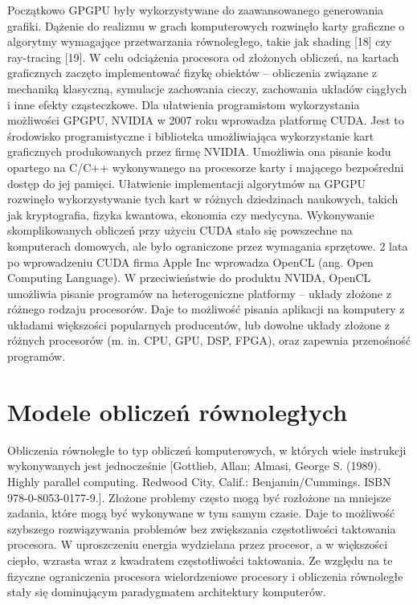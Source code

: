 Początkowo GPGPU były wykorzystywane do zaawansowanego generowania grafiki. Dążenie do realizmu w grach komputerowych rozwinęło karty graficzne o algorytmy wymagające przetwarzania równoległego, takie jak shading [18] czy ray-tracing [19]. W celu odciążenia procesora od złożonych obliczeń, na kartach graficznych zaczęto implementować fizykę obiektów – obliczenia związane z mechaniką klasyczną, symulacje zachowania cieczy, zachowania układów ciągłych i inne efekty cząsteczkowe. Dla ułatwienia programistom wykorzystania możliwości GPGPU, NVIDIA w 2007 roku wprowadza platformę CUDA. Jest to środowisko programistyczne i biblioteka umożliwiająca wykorzystanie kart graficznych produkowanych przez firmę NVIDIA. Umożliwia ona pisanie kodu opartego na C/C++ wykonywanego na procesorze karty i mającego bezpośredni dostęp do jej pamięci. Ułatwienie implementacji algorytmów na GPGPU rozwinęło wykorzystywanie tych kart w różnych dziedzinach naukowych, takich jak kryptografia, fizyka kwantowa, ekonomia czy medycyna. Wykonywanie  skomplikowanych obliczeń przy użyciu CUDA stało się powszechne na komputerach domowych, ale było ograniczone przez wymagania sprzętowe. 2 lata po wprowadzeniu CUDA firma Apple Inc wprowadza OpenCL (ang. Open Computing Language). W przeciwieństwie do produktu NVIDA, OpenCL umożliwia pisanie programów na heterogeniczne platformy – układy złożone z różnego rodzaju procesorów. Daje to możliwość pisania aplikacji na komputery z układami większości popularnych producentów, lub dowolne układy złożone z różnych procesorów (m. in. CPU, GPU, DSP, FPGA), oraz zapewnia przenośność programów.


\section{Modele obliczeń równoległych}\label{sec:Paralellism}

Obliczenia równoległe to typ obliczeń komputerowych, w których wiele instrukcji wykonywanych jest jednocześnie [Gottlieb, Allan; Almasi, George S. (1989). Highly parallel computing. Redwood City, Calif.: Benjamin/Cummings. ISBN 978-0-8053-0177-9.]. Złożone problemy często mogą być rozłożone na mniejsze zadania, które mogą być wykonywane w tym samym czasie. Daje to możliwość szybszego rozwiązywania problemów bez zwiększania częstotliwości taktowania procesora. W uproszczeniu energia wydzielana przez procesor, a w większości ciepło, wzrasta wraz z kwadratem częstotliwości taktowania. Ze względu na te fizyczne ograniczenia procesora wielordzeniowe procesory i obliczenia równoległe stały się dominującym paradygmatem architektury komputerów.

